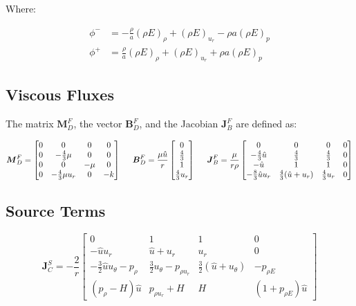\documentclass[10pt]{article}
\begin{document}
\begin{flushleft}
Where:

\begin{align*}
    \phi^- &= -\frac{\rho}{a} (\rho E)_\rho + (\rho E)_{u_r} - \rho a (\rho E)_p \\
    \phi^+ &= \frac{\rho}{a} (\rho E)_\rho + (\rho E)_{u_r} + \rho a (\rho E)_p
\end{align*}


\subsection{Viscous Fluxes}

The matrix $\boldsymbol{M}_D^F$, the vector $\boldsymbol{B}_D^F$, and the Jacobian $\boldsymbol{J}_B^F$ are defined as:

\begin{equation*}
\boldsymbol{M}_D^F = \begin{bmatrix}
    0 & 0 & 0 & 0 \\
    0 & -\frac{4}{3} \mu & 0 & 0 \\
    0 & 0 & -\mu & 0 \\
    0 & -\frac{4}{3} \mu u_r & 0 & -k
\end{bmatrix}
\hspace{5mm}
\boldsymbol{B}_D^F = \frac{\mu \hat{u}}{r}\begin{bmatrix}
    0 \\
    \frac{4}{3} \\
    1 \\
    \frac{4}{3} u_r
\end{bmatrix}
\hspace{5mm}
\boldsymbol{J}_B^F = \frac{\mu}{r \rho} \begin{bmatrix}
    0 & 0 & 0 & 0 \\
    - \frac{4}{3} \hat{u} & \frac{4}{3} & \frac{4}{3} & 0 \\
    - \hat{u} & 1 & 1 & 0 \\
    -\frac{8}{3} \hat{u} u_r & \frac{4}{3} (\hat{u} + u_r) & \frac{4}{3} u_r & 0
\end{bmatrix}
\end{equation*}

\subsection{Source Terms}

\begin{equation*}
    \boldsymbol{J}_C^S = -\frac{2}{r} \begin{bmatrix}
        0 & 1 & 1 & 0 \\
        -\hat{u} u_r & \hat{u} + u_r & u_r & 0 \\
        -\frac{3}{2} \hat{u} u_\theta - p_\rho & \frac{3}{2} u_\theta - p_{\rho u_r} & \frac{3}{2} (\hat{u} + u_\theta) & -p_{\rho E} \\
        (p_\rho - H) \hat{u} & p_{\rho u_r} + H & H & (1 + p_{\rho E}) \hat{u}
    \end{bmatrix}
\end{equation*}



\end{flushleft}
\end{document}
